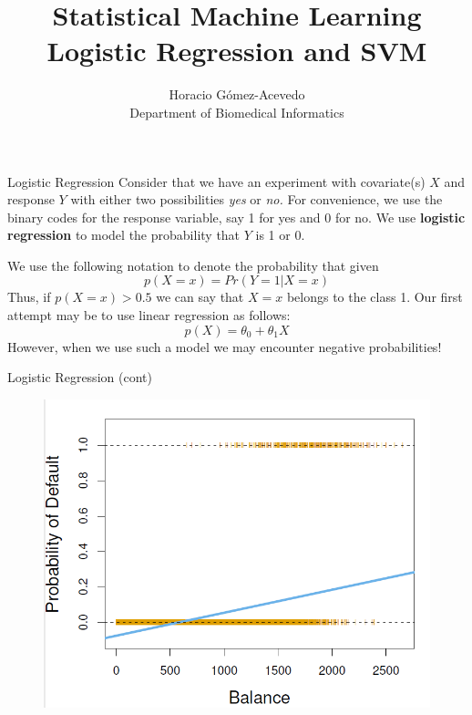 \documentclass{beamer}
\title{Statistical Machine Learning\\ Logistic Regression and SVM}
\author{Horacio G\'omez-Acevedo\\ Department of Biomedical Informatics}
\begin{document}
	\begin{frame}[plain]
		\maketitle
	\end{frame}
\begin{frame}{Logistic Regression}
	Consider that we have an experiment with covariate(s) $X$ and response $Y$ with either two possibilities {\it yes} or {\it no.}
	For convenience, we use the binary codes for the response variable, say 1 for yes and 0 for no. We use {\bf logistic regression} to model the probability that $Y$ is 1 or 0. 
	
	We use the following notation to denote the probability that given 
	\begin{equation*}
		p(X=x)= Pr(Y=1 | X=x)
	\end{equation*}
 Thus, if $p(X=x)>0.5$ we can say that $X=x$ belongs to the class 1. 
 Our first attempt may be to use linear regression as follows:
 \begin{equation*}
 	p(X)= \theta_0+ \theta_1 X
 \end{equation*}
However, when we use such a model we may encounter negative probabilities!

\end{frame}

\begin{frame}{Logistic Regression (cont)}
	
		\begin{figure}[h]
		\centering
		\includegraphics[scale=0.5]{../../Figures/fig_logreg.png}
	\end{figure}
\end{frame}
\end{document}
